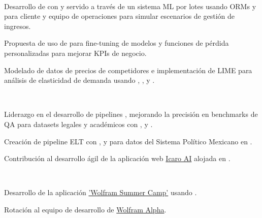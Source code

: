 \documentclass[]{tex/deedy-resume-openfont}
\begin{document}
\begin{minipage}[t]{0.66\textwidth}
\\
\begin{tightemize}
    \item Desarrollo de  con  y servido a través de un sistema ML por lotes usando  ORMs y  para cliente y equipo de operaciones para simular escenarios de gestión de ingresos.
    \item Propuesta de uso de  para fine-tuning de modelos y funciones de pérdida personalizadas para mejorar KPIs de negocio.
    \item Modelado de datos de precios de competidores e implementación de LIME para análisis de elasticidad de demanda usando , ,  y .
\end{tightemize}
\sectionsep

\\
\begin{tightemize}
    \item Liderazgo en el desarrollo de pipelines , mejorando la precisión en benchmarks de QA para datasets legales y académicos con ,  y .
    \item Creación de pipeline ELT con ,  y  para datos del Sistema Político Mexicano en .
    \item Contribución al desarrollo ágil de la aplicación web \href{http://www.icaro.ai/home/}{Icaro AI} alojada en .
\end{tightemize}
\sectionsep

\\
\begin{tightemize}
    \item Desarrollo de la aplicación \href{https://education.wolfram.com/summer-camp/}{'Wolfram Summer Camp'} usando \href{https://www.wolfram.com/wolfram-one/}{}.
    \item Rotación al equipo de desarrollo de \href{https://www.wolframalpha.com/}{Wolfram Alpha}.
\end{tightemize}
\sectionsep



\end{minipage}
\end{document}
